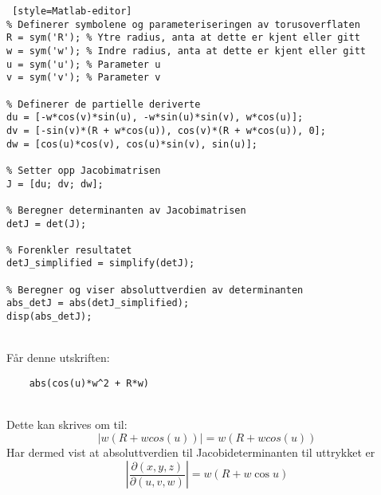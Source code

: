 \begin{lstlisting} [style=Matlab-editor]
% Definerer symbolene og parameteriseringen av torusoverflaten
R = sym('R'); % Ytre radius, anta at dette er kjent eller gitt
w = sym('w'); % Indre radius, anta at dette er kjent eller gitt
u = sym('u'); % Parameter u
v = sym('v'); % Parameter v

% Definerer de partielle deriverte
du = [-w*cos(v)*sin(u), -w*sin(u)*sin(v), w*cos(u)];
dv = [-sin(v)*(R + w*cos(u)), cos(v)*(R + w*cos(u)), 0];
dw = [cos(u)*cos(v), cos(u)*sin(v), sin(u)];

% Setter opp Jacobimatrisen
J = [du; dv; dw];

% Beregner determinanten av Jacobimatrisen
detJ = det(J);

% Forenkler resultatet
detJ_simplified = simplify(detJ);

% Beregner og viser absoluttverdien av determinanten
abs_detJ = abs(detJ_simplified);
disp(abs_detJ);
\end{lstlisting}\\
\newpage
Får denne utskriften:
\vspace{0.1in}
\begin{lstlisting}
    abs(cos(u)*w^2 + R*w)
\end{lstlisting}
\\ Dette kan skrives om til: 
\begin{equation} \nonumber
    \left|w(R+ wcos(u))\right|= w(R+ wcos(u))
\end{equation}
Har dermed vist at absoluttverdien til Jacobideterminanten til uttrykket er
\begin{equation} \nonumber
    \left|\frac{\partial(x, y, z)}{\partial(u, v, w)}\right| = w(R + w\cos u)
\end{equation}\vspace{0.3 in}

